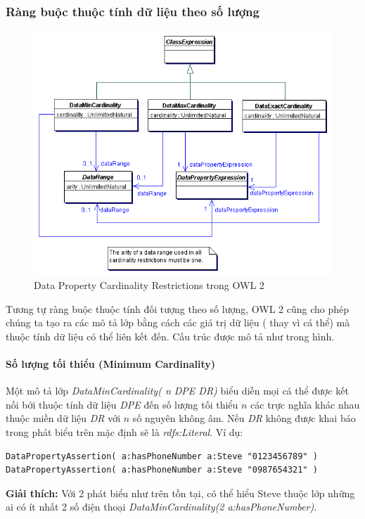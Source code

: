 \subsubsection{Ràng buộc thuộc tính dữ liệu theo số lượng}
\begin{figure}[h]
	\centering
	\includegraphics[width=150mm]{Figures/ce_4.png}
	\caption{Data Property Cardinality Restrictions trong OWL 2\label{overflow}}
\end{figure}
Tương tự ràng buộc thuộc tính đối tượng theo số lượng, OWL 2 cũng cho phép chúng ta tạo ra các mô tả lớp bằng cách các giá trị dữ liệu ( thay vì cá thể) mà thuộc tính dữ liệu có thể liên kết đến. Cấu trúc được mô tả như trong hình.

\paragraph{Số lượng tối thiểu (Minimum Cardinality)} Một mô tả lớp \textit{DataMinCardinality( n DPE DR)}  biểu diễn mọi cá thể được kết nối bởi thuộc tính dữ liệu \textit{DPE} đến số lượng tối thiểu $n$ các trực nghĩa khác nhau thuộc miền dữ liệu  \textit{DR} với $n$ số nguyên không âm. Nếu \textit{DR} không được khai báo trong phát biểu trên mặc định sẽ là \textit{rdfs:Literal}. Ví dụ:
\begin{verbatim}
DataPropertyAssertion( a:hasPhoneNumber a:Steve "0123456789" )
DataPropertyAssertion( a:hasPhoneNumber a:Steve "0987654321" )
\end{verbatim}
\textbf{Giải thích:} Với 2 phát biểu như trên tồn tại, có thể hiểu Steve thuộc lớp những ai có ít nhất 2 số điện thoại \textit{DataMinCardinality(2 a:hasPhoneNumber)}.

